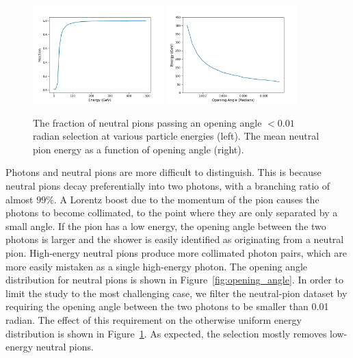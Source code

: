 \begin{figure}[htbp]
    \centering
    \includegraphics[width=0.45\textwidth]{Images/Calo/opening_angle_cut_vs_energy.png}
    \includegraphics[width=0.45\textwidth]{Images/Calo/mean_energy_vs_opening_angle.png}
    \caption{The fraction of neutral pions passing an opening angle $< 0.01$ radian selection at various particle energies (left). The mean neutral pion energy as a function of opening angle (right).}
    \label{fig:opening_angle_energy}
\end{figure}

Photons and neutral pions are more difficult to distinguish. This is because neutral pions decay preferentially into two photons, with a branching ratio of almost $99\%$. A Lorentz boost due to the momentum of the pion causes the photons to become collimated, to the point where they are only separated by a small angle. If the pion has a low energy, the opening angle between the two photons is larger and the shower is easily identified as originating from a neutral pion. High-energy neutral pions produce more collimated photon pairs, which are more easily mistaken as a single high-energy photon. The opening angle distribution for neutral pions is shown in Figure~\ref{fig:opening_angle}. In order to limit the study to the most challenging case, we filter the neutral-pion dataset by requiring the opening angle between the two photons to be smaller than 0.01 radian.  The effect of  this requirement on the otherwise uniform energy distribution is shown in Figure~\ref{fig:opening_angle_energy}. As expected, the selection mostly removes low-energy neutral pions. 

